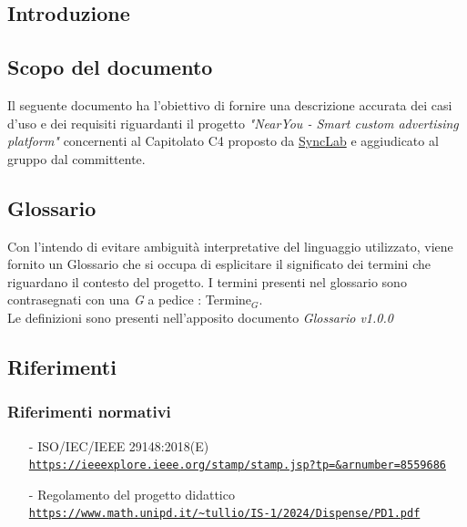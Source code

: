 \documentclass[11pt]{article}
\begin{document}
\newpage
\begin{justify}
    

\section{Introduzione}
\label{sec:intro}

\subsection{Scopo del documento}

Il seguente documento ha l'obiettivo di fornire una descrizione accurata dei casi d'uso e dei requisiti riguardanti il progetto \textit{"NearYou - 
Smart custom advertising platform"} concernenti al Capitolato C4 proposto da \href{https://www.synclab.it/home}{SyncLab} e aggiudicato al gruppo dal committente.


\subsection{Glossario}
Con l'intendo di evitare ambiguità interpretative del linguaggio utilizzato, viene fornito un Glossario che si occupa di esplicitare il significato dei termini che riguardano il contesto del progetto. I termini presenti nel glossario sono contrasegnati con una \textit{G} a pedice : Termine\(_G\).\\
Le definizioni sono presenti nell'apposito documento \textit{Glossario v1.0.0}


\subsection{Riferimenti}


\subsubsection{Riferimenti normativi}
\begin{itemize}
    \item[-] ISO/IEC/IEEE 29148:2018(E) \\
    \textcolor{blue}{\texttt{\url{https://ieeexplore.ieee.org/stamp/stamp.jsp?tp=&arnumber=8559686}}}
    
    \item[-] Regolamento del progetto didattico  \\
    \textcolor{blue}{\texttt{\url{https://www.math.unipd.it/~tullio/IS-1/2024/Dispense/PD1.pdf}}}
    

\end{itemize}
\end{justify}
\end{document}
